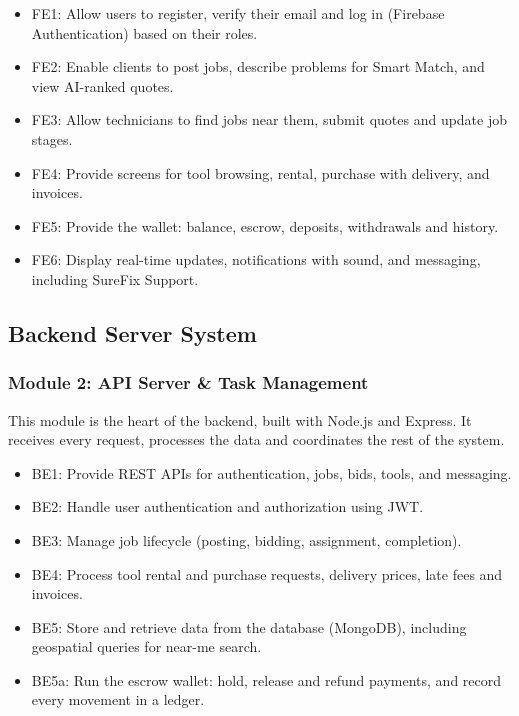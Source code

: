 \documentclass[A4paper,12pt]{report}
\theoremstyle{plain}
\theoremstyle{definition}
\theoremstyle{remark}
\numberwithin{equation}{section}
\begin{document}
\begin{itemize}
    \item FE1: Allow users to register, verify their email and log in (Firebase Authentication) based on their roles.
    \item FE2: Enable clients to post jobs, describe problems for Smart Match, and view AI-ranked quotes.
    \item FE3: Allow technicians to find jobs near them, submit quotes and update job stages.
    \item FE4: Provide screens for tool browsing, rental, purchase with delivery, and invoices.
    \item FE5: Provide the wallet: balance, escrow, deposits, withdrawals and history.
    \item FE6: Display real-time updates, notifications with sound, and messaging, including SureFix Support.
\end{itemize}

\subsection{Backend Server System}

\subsubsection{Module 2: API Server \& Task Management}

This module is the heart of the backend, built with Node.js and Express. It receives every request, processes the data and coordinates the rest of the system.

\begin{itemize}
    \item BE1: Provide REST APIs for authentication, jobs, bids, tools, and messaging.
    \item BE2: Handle user authentication and authorization using JWT.
    \item BE3: Manage job lifecycle (posting, bidding, assignment, completion).
        \item BE4: Process tool rental and purchase requests, delivery prices, late fees and invoices.
    \item BE5: Store and retrieve data from the database (MongoDB), including geospatial queries for near-me search.
    \item BE5a: Run the escrow wallet: hold, release and refund payments, and record every movement in a ledger.
\end{itemize}
\end{document}
